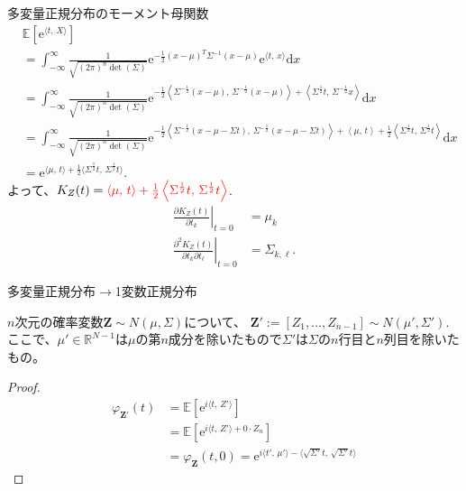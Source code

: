 \documentclass[lualatex,handout]{beamer}
\newcommand{\mycolor}[2]{%
  \begingroup
  \colorlet{currentcolor}{.}%
  \color{#1}#2%
  \color{currentcolor}%
  \endgroup
}
\newcommand{\emm}[1]{\mycolor{red}{#1}}
\newcommand{\expt}[1]{\mathbb{E}\left[#1\right]}
\theoremstyle{definition}
\begin{document}
\begin{frame}{多変量正規分布のモーメント母関数}
\small
\begin{align*}
&\expt{\mathrm{e}^{\langle t,\,X\rangle}}\\
&=\int_{-\infty}^\infty \frac1{\sqrt{(2\pi)^n\det(\Sigma)}} \mathrm{e}^{-\frac12 (x-\mu)^T\Sigma^{-1} (x-\mu)}\mathrm{e}^{\langle t,\, x\rangle}\mathrm{d}x\\
&= \int_{-\infty}^\infty \frac1{\sqrt{(2\pi)^n\det(\Sigma)}} \mathrm{e}^{-\frac12 \left\langle\Sigma^{-\frac12}(x-\mu),\,\Sigma^{-\frac12}(x-\mu)\right\rangle+\left\langle \Sigma^{\frac12}t,\, \Sigma^{-\frac12}x\right\rangle}\mathrm{d}x\\
&= \int_{-\infty}^\infty \frac1{\sqrt{(2\pi)^n\det(\Sigma)}} \mathrm{e}^{-\frac12 \left\langle\Sigma^{-\frac12}(x-\mu-\Sigma t),\,\Sigma^{-\frac12}(x-\mu-\Sigma t)\right\rangle +\left\langle \mu,\, t\right\rangle + \frac12\left\langle \Sigma^\frac12t,\,\Sigma^\frac12t\right\rangle}\mathrm{d}x\\
&= \mathrm{e}^{\langle \mu,\, t\rangle + \frac12\langle \Sigma^\frac12t,\,\Sigma^\frac12t\rangle}.
\end{align*}
よって、$K_Z(t) = \emm{\langle \mu,\, t\rangle + \frac12\left\langle \Sigma^\frac12t,\,\Sigma^\frac12t\right\rangle}$.
\begin{align*}
\left.\frac{\partial K_Z(t)}{\partial t_k}\right|_{t=0} &= \mu_k\\
\left.\frac{\partial^2 K_Z(t)}{\partial t_k\partial t_\ell}\right|_{t=0} &= \Sigma_{k, \ell}.
\end{align*}
\end{frame}

\begin{frame}{多変量正規分布$\to$1変数正規分布}
\begin{lemma}
$n$次元の確率変数$\symbf{Z}\sim N(\mu, \Sigma)$について、
$\symbf{Z}':=[Z_1,\dotsc,Z_{n-1}]\sim N(\mu', \Sigma')$.
ここで、$\mu'\in\mathbb{R}^{N-1}$は$\mu$の第$n$成分を除いたもので$\Sigma'$は$\Sigma$の$n$行目と$n$列目を除いたもの。
\end{lemma}
\begin{proof}
\begin{align*}
\varphi_{\symbf{Z}'}(t) &= \expt{\mathrm{e}^{i\langle t,\,Z'\rangle}}\\
&=\expt{\mathrm{e}^{i\langle t,\, Z'\rangle + 0\cdot Z_n}}\\
&=\varphi_{\symbf{Z}}(t,0) = \mathrm{e}^{i\langle t',\,\mu'\rangle - \langle \sqrt{\Sigma'}t,\,\sqrt{\Sigma'}t\rangle}
\end{align*}
\end{proof}
\end{frame}
\end{document}

